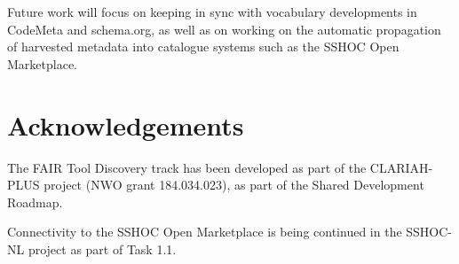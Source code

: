 \documentclass[a4paper,11pt]{article}
\begin{document}
Future work will focus on keeping in sync with vocabulary developments in
CodeMeta and schema.org, as well as on working on the automatic propagation of
harvested metadata into catalogue systems such as the SSHOC Open Marketplace.

\section*{Acknowledgements}

The FAIR Tool Discovery track has been developed as part of the CLARIAH-PLUS
project (NWO grant 184.034.023), as part of the Shared Development Roadmap.

Connectivity to the SSHOC Open Marketplace is being continued in the 
SSHOC-NL project as part of Task 1.1.

\printbibliography
\end{document}
